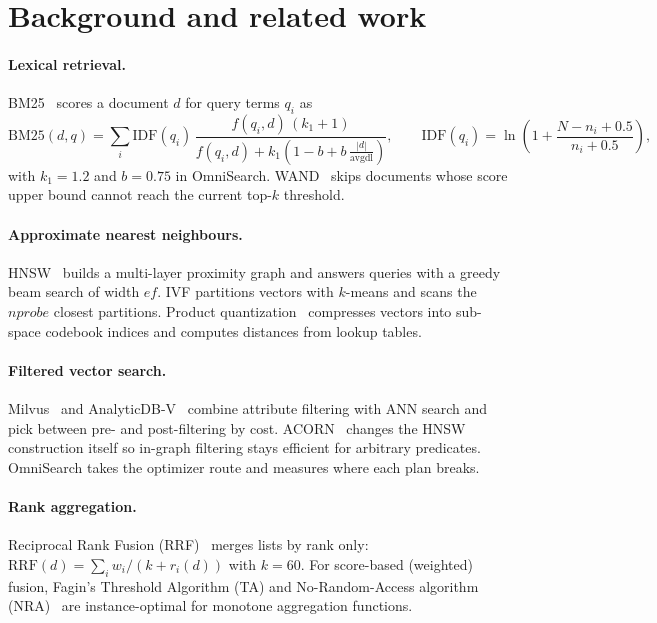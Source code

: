 \documentclass[11pt,a4paper]{article}
\begin{document}
\section{Background and related work}
\label{sec:related}

\paragraph{Lexical retrieval.} BM25~\cite{bm25} scores a document $d$ for query terms $q_i$ as
\begin{equation}
  \mathrm{BM25}(d,q) = \sum_{i} \mathrm{IDF}(q_i)\,
  \frac{f(q_i,d)\,(k_1+1)}{f(q_i,d) + k_1\left(1-b+b\,\frac{|d|}{\mathrm{avgdl}}\right)},
  \qquad \mathrm{IDF}(q_i) = \ln\!\left(1 + \frac{N - n_i + 0.5}{n_i + 0.5}\right),
\end{equation}
with $k_1 = 1.2$ and $b = 0.75$ in OmniSearch. WAND~\cite{wand} skips documents whose score upper bound
cannot reach the current top-$k$ threshold.

\paragraph{Approximate nearest neighbours.} HNSW~\cite{hnsw} builds a multi-layer proximity graph and
answers queries with a greedy beam search of width $ef$. IVF partitions vectors with $k$-means and
scans the $nprobe$ closest partitions. Product quantization~\cite{pq} compresses vectors into
sub-space codebook indices and computes distances from lookup tables.

\paragraph{Filtered vector search.} Milvus~\cite{milvus} and AnalyticDB-V~\cite{adbv} combine
attribute filtering with ANN search and pick between pre- and post-filtering by cost. ACORN~\cite{acorn}
changes the HNSW construction itself so in-graph filtering stays efficient for arbitrary predicates.
OmniSearch takes the optimizer route and measures where each plan breaks.

\paragraph{Rank aggregation.} Reciprocal Rank Fusion (RRF)~\cite{rrf} merges lists by rank only:
$\mathrm{RRF}(d) = \sum_i w_i/(k + r_i(d))$ with $k=60$. For score-based (weighted) fusion, Fagin's
Threshold Algorithm (TA) and No-Random-Access algorithm (NRA)~\cite{fagin2001} are instance-optimal for
monotone aggregation functions.
\end{document}
